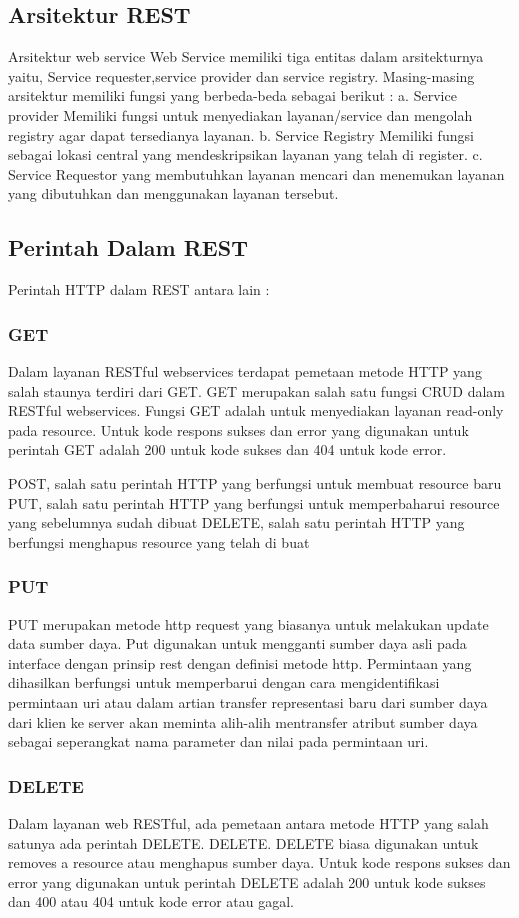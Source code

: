 \documentclass[12pt,a4paper]{article}
\begin{document}
\subsection{Arsitektur REST}
Arsitektur web service
Web Service memiliki tiga entitas dalam arsitekturnya yaitu, Service requester,service provider dan service registry. Masing-masing arsitektur memiliki fungsi yang berbeda-beda sebagai berikut :
a.	Service provider
Memiliki fungsi untuk menyediakan layanan/service dan mengolah registry agar dapat tersedianya layanan.
b.	Service Registry 
Memiliki fungsi sebagai lokasi central yang mendeskripsikan layanan yang telah di register.
c.	Service Requestor 
yang membutuhkan layanan mencari dan menemukan layanan yang dibutuhkan dan menggunakan layanan tersebut.

\subsection{Perintah Dalam REST}
Perintah HTTP dalam REST antara lain :
\subsubsection{GET}
Dalam layanan RESTful webservices terdapat pemetaan metode HTTP yang salah staunya terdiri dari GET. GET merupakan salah satu fungsi CRUD dalam RESTful webservices. Fungsi GET adalah untuk menyediakan layanan read-only pada resource. Untuk kode respons sukses dan error yang digunakan untuk perintah GET adalah 200 untuk kode sukses dan 404 untuk kode error. 

POST, salah satu perintah HTTP yang berfungsi untuk membuat resource baru
PUT, salah satu perintah HTTP yang berfungsi untuk memperbaharui resource yang sebelumnya sudah dibuat
DELETE, salah satu perintah HTTP yang berfungsi menghapus resource yang telah di buat
\subsubsection{PUT}
PUT merupakan metode http request yang biasanya untuk melakukan update data sumber daya. Put digunakan untuk mengganti sumber daya asli pada interface dengan prinsip rest dengan definisi metode http. Permintaan yang dihasilkan berfungsi untuk memperbarui dengan cara  mengidentifikasi permintaan uri atau dalam artian transfer representasi baru dari sumber daya dari klien ke server akan meminta alih-alih mentransfer atribut sumber daya sebagai seperangkat nama parameter dan nilai pada permintaan uri.
\subsubsection{DELETE}
Dalam layanan web RESTful, ada pemetaan antara metode HTTP  yang salah satunya ada perintah DELETE. DELETE. DELETE biasa digunakan untuk removes a resource atau menghapus sumber daya. Untuk kode respons sukses dan error yang digunakan untuk perintah DELETE adalah 200 untuk kode sukses dan 400 atau 404 untuk kode error atau gagal. 
\end{document}
